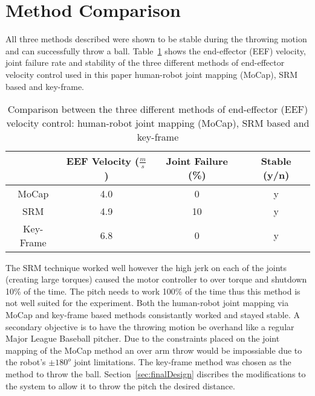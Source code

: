 \section{Method Comparison}\label{sec:comparison}
All three methods described were shown to be stable during the throwing motion and can successfully throw a ball.  Table~\ref{table:comp} shows the end-effector (EEF) velocity, joint failure rate and stability of the three different methods of end-effector velocity control used in this paper human-robot joint mapping (MoCap), SRM based and key-frame.

\begin{table}[!t]
\renewcommand{\arraystretch}{1.3}
\caption{Comparison between the three different methods of end-effector (EEF) velocity control: human-robot joint mapping (MoCap), SRM based and key-frame}
\label{table:comp}
\centering
\begin{tabular}{|c|c|c|c|}
\hline
  				& EEF Velocity ($\frac{m}{s}$)					& Joint Failure (\%)			& Stable (y/n) 	\\
\hline
MoCap 		& 4.0																		& 0												& y 						\\
\hline
SRM 			& 4.9																		& 10											& y							\\
\hline
Key-Frame & 6.8 																	& 0 											&	y							\\
\hline
\end{tabular}
\end{table}

The SRM technique worked well however the high jerk on each of the joints (creating large torques) caused the motor controller to over torque and shutdown 10\% of the time.  The pitch needs to work 100\% of the time thus this method is not well suited for the experiment.  Both the human-robot joint mapping via MoCap and key-frame based methods consistantly worked and stayed stable.  A secondary objective is to have the throwing motion be overhand like a regular Major League Baseball pitcher.  Due to the constraints placed on the joint mapping of the MoCap method an over arm throw would be impossiable due to the robot's $\pm180^o$ joint limitations.  The key-frame method was chosen as the method to throw the ball.  Section~\ref{sec:finalDesign} discribes the modifications to the system to allow it to throw the pitch the desired distance.